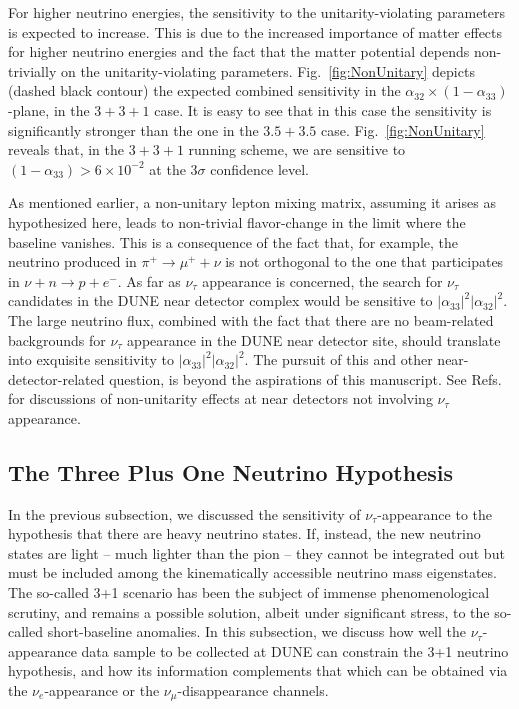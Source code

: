 \documentclass[aps,prd,onecolumn,nofootinbib,superscriptaddress, 11pt]{revtex4}
\begin{document}
For higher neutrino energies, the sensitivity to the unitarity-violating parameters is expected to increase. This is due to the increased importance of matter effects for higher neutrino energies and the fact that the matter potential depends non-trivially on the unitarity-violating parameters. Fig.~\ref{fig:NonUnitary} depicts (dashed black contour) the expected combined sensitivity  in the $\alpha_{32}\times(1-\alpha_{33})$-plane, in the $3+3+1$ case. It is easy to see that in this case the sensitivity is significantly stronger than the one in the $3.5+3.5$ case. Fig.~\ref{fig:NonUnitary} reveals that, in the $3+3+1$ running scheme, we are sensitive to $(1-\alpha_{33}) > 6 \times 10^{-2}$ at the $3\sigma$ confidence level.

As mentioned earlier, a non-unitary lepton mixing matrix, assuming it arises as hypothesized here, leads to non-trivial flavor-change in the limit where the baseline vanishes. This is a consequence of the fact that, for example, the neutrino produced in $\pi^+\to\mu^++\nu$ is not orthogonal to the one that participates in $\nu+n\to p+e^-$. As far as $\nu_{\tau}$ appearance is concerned, the search for $\nu_{\tau}$ candidates in the DUNE near detector complex would be sensitive to $|\alpha_{33}|^2|\alpha_{32}|^2$. The large neutrino flux, combined with the fact that there are no beam-related backgrounds for $\nu_{\tau}$ appearance in the DUNE near detector site, should translate into exquisite sensitivity to $|\alpha_{33}|^2 |\alpha_{32}|^2$. The pursuit of this and other near-detector-related question, is beyond the aspirations of this manuscript. See Refs.~\cite{Hernandez-Garcia:2017pwx,Miranda:2018yym,Dutta:2019hmb} for discussions of non-unitarity effects at near detectors not involving $\nu_\tau$ appearance.


\setcounter{footnote}{0}
\subsection{The Three Plus One Neutrino Hypothesis}
\label{sec:sterile}

In the previous subsection, we discussed the sensitivity of $\nu_{\tau}$-appearance to the hypothesis that there are heavy neutrino states. If, instead, the new neutrino states are light -- much lighter than the pion -- they cannot be integrated out but must be included among the kinematically accessible neutrino mass eigenstates. The so-called 3+1 scenario has been the subject of immense phenomenological scrutiny, and remains a possible solution, albeit under significant stress, to the so-called short-baseline anomalies. In this subsection, we discuss how well the $\nu_{\tau}$-appearance data sample to be collected at DUNE can constrain the 3+1 neutrino hypothesis, and how its information complements that which can be obtained via the $\nu_e$-appearance or the $\nu_{\mu}$-disappearance channels.
\end{document}
